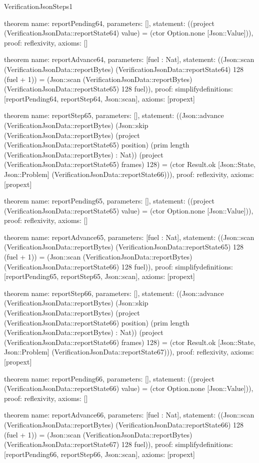 \begin{lexlean}{VerificationJsonSteps1}
\begin{semanticmodule}
theorem{
  name: reportPending64,
  parameters: [],
  statement: ((project (VerificationJsonData::reportState64) value) = (ctor Option.none [Json::Value])),
  proof: reflexivity{},
  axioms: []
}

theorem{
  name: reportAdvance64,
  parameters: [fuel : Nat],
  statement: ((Json::scan (VerificationJsonData::reportBytes) (VerificationJsonData::reportState64) 128 (fuel + 1)) = (Json::scan (VerificationJsonData::reportBytes) (VerificationJsonData::reportState65) 128 fuel)),
  proof: simplify{definitions: [reportPending64, reportStep64, Json::scan]},
  axioms: [propext]
}

theorem{
  name: reportStep65,
  parameters: [],
  statement: ((Json::advance (VerificationJsonData::reportBytes) (Json::skip (VerificationJsonData::reportBytes) (project (VerificationJsonData::reportState65) position) (prim length (VerificationJsonData::reportBytes) : Nat)) (project (VerificationJsonData::reportState65) frames) 128) = (ctor Result.ok [Json::State, Json::Problem] (VerificationJsonData::reportState66))),
  proof: reflexivity{},
  axioms: [propext]
}

theorem{
  name: reportPending65,
  parameters: [],
  statement: ((project (VerificationJsonData::reportState65) value) = (ctor Option.none [Json::Value])),
  proof: reflexivity{},
  axioms: []
}

theorem{
  name: reportAdvance65,
  parameters: [fuel : Nat],
  statement: ((Json::scan (VerificationJsonData::reportBytes) (VerificationJsonData::reportState65) 128 (fuel + 1)) = (Json::scan (VerificationJsonData::reportBytes) (VerificationJsonData::reportState66) 128 fuel)),
  proof: simplify{definitions: [reportPending65, reportStep65, Json::scan]},
  axioms: [propext]
}

theorem{
  name: reportStep66,
  parameters: [],
  statement: ((Json::advance (VerificationJsonData::reportBytes) (Json::skip (VerificationJsonData::reportBytes) (project (VerificationJsonData::reportState66) position) (prim length (VerificationJsonData::reportBytes) : Nat)) (project (VerificationJsonData::reportState66) frames) 128) = (ctor Result.ok [Json::State, Json::Problem] (VerificationJsonData::reportState67))),
  proof: reflexivity{},
  axioms: [propext]
}

theorem{
  name: reportPending66,
  parameters: [],
  statement: ((project (VerificationJsonData::reportState66) value) = (ctor Option.none [Json::Value])),
  proof: reflexivity{},
  axioms: []
}

theorem{
  name: reportAdvance66,
  parameters: [fuel : Nat],
  statement: ((Json::scan (VerificationJsonData::reportBytes) (VerificationJsonData::reportState66) 128 (fuel + 1)) = (Json::scan (VerificationJsonData::reportBytes) (VerificationJsonData::reportState67) 128 fuel)),
  proof: simplify{definitions: [reportPending66, reportStep66, Json::scan]},
  axioms: [propext]
}


\end{semanticmodule}
\end{lexlean}
